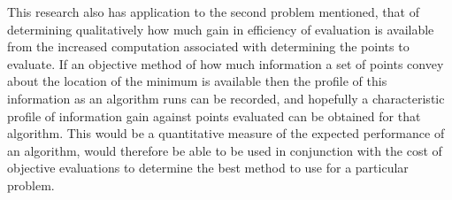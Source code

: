 \documentclass[a4paper, 10 pt, conference]{ieeeconf}  %
\begin{document}
This research also has application to the second problem mentioned, that of determining qualitatively how much gain in efficiency of evaluation is available from the increased computation associated with determining the points to evaluate. If an objective method of how much information a set of points convey about the location of the minimum is available then the profile of this information as an algorithm runs can be recorded, and hopefully a characteristic profile of information gain against points evaluated can be obtained for that algorithm. This would be a quantitative measure of the expected performance of an algorithm, would therefore be able to be used in conjunction with the cost of objective evaluations to determine the best method to use for a particular problem.


\section*{}
\pagebreak
\singlespacing
\onecolumn



\end{document}
